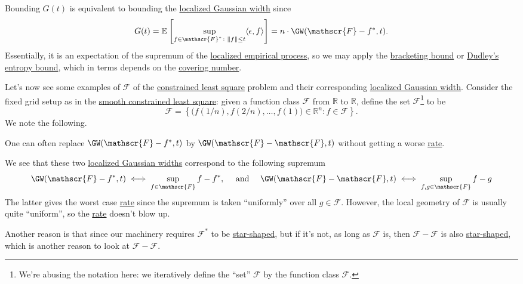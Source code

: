 \begin{prev}
	Bounding \(G(t)\) is equivalent to bounding the \hyperref[def:localized-Gaussian-width]{localized Gaussian width} since
	\[
		G(t)
		= \mathbb{E}_{}\left[\sup _{f\in \mathscr{F} ^{\ast} \colon \lVert f \rVert \leq t} \langle \epsilon , f \rangle \right]
		= n \cdot \GW(\mathscr{F} - f^{\ast} , t).
	\]
	Essentially, it is an expectation of the supremum of the \hyperref[def:localized-EP]{localized empirical process}, so we may apply the \hyperref[thm:bracketing-bound]{bracketing bound} or \hyperref[thm:Dudley-entropy-bound]{Dudley's entropy bound}, which in terms depends on the \hyperref[def:covering-number]{covering number}.
\end{prev}

Let's now see some examples of \(\mathscr{F} \) of the \hyperref[prb:constrained-LS]{constrained least square} problem and their corresponding \hyperref[def:localized-Gaussian-width]{localized Gaussian width}. Consider the fixed grid setup as in the \hyperref[prb:smooth-LS]{smooth constrained least square}: given a function class \(\mathscr{F} \) from \(\mathbb{R} \) to \(\mathbb{R} \), define the set \(\mathscr{F} \)\footnote{We're abusing the notation here: we iteratively define the ``set'' \(\mathscr{F} \) by the function class \(\mathscr{F} \).} to be
\[
	\mathscr{F} = \left\{ \big( f(1 / n), f(2 / n), \dots , f(1) \big) \in \mathbb{R} ^n \colon f \in \mathscr{F} \right\} .
\]
We note the following.

\begin{remark}
	One can often replace \(\GW(\mathscr{F} - f^{\ast} , t) \) by \(\GW(\mathscr{F} - \mathscr{F} , t) \) without getting a worse \hyperref[def:rate-of-convergence]{rate}.
\end{remark}
\begin{explanation}
	We see that these two \hyperref[def:localized-Gaussian-width]{localized Gaussian widths} correspond to the following supremum
	\[
		\GW(\mathscr{F} - f^{\ast} , t)   \iff \sup _{f\in \mathscr{F} } f - f^{\ast}, \quad \text{ and } \quad
		\GW(\mathscr{F} - \mathscr{F} , t) \iff \sup _{f, g \in \mathscr{F} } f - g
	\]
	The latter gives the worst case \hyperref[def:rate-of-convergence]{rate} since the supremum is taken ``uniformly'' over all \(g\in \mathscr{F} \). However, the local geometry of \(\mathscr{F} \) is usually quite ``uniform'', so the \hyperref[def:rate-of-convergence]{rate} doesn't blow up.

	Another reason is that since our machinery requires \(\mathscr{F} ^{\ast} \) to be \hyperref[def:star-shaped]{star-shaped}, but if it's not, as long as \(\mathscr{F} \) is, then \(\mathscr{F} - \mathscr{F} \) is also \hyperref[def:star-shaped]{star-shaped}, which is another reason to look at \(\mathscr{F} - \mathscr{F} \).
\end{explanation}

